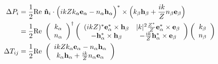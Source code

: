 \documentclass[letterpaper]{article}
\begin{document}
\begin{align}
 \Delta P_i
 &= \frac{1}{2}\text{Re }
    \mathbf{\hat n}_i
    \cdot 
    \Big(ikZ k_\alpha \mathbf{e}_\alpha - n_\alpha \mathbf{h}_\alpha\Big)^* 
    \times
    \Big( k_\beta \mathbf{h}_\beta + \frac{ik}{Z} n_\beta \mathbf{e}_\beta \Big)
\\
&= \frac{1}{2}\text{Re }
   \left(\begin{array}{c}
     k_\alpha \\ n_\alpha 
   \end{array}\right)^\dagger
   \left(\begin{array}{cc}
    (ikZ)^*              \mathbf{e}^*_\alpha \times \mathbf{h}_\beta & 
    |k|^2 \frac{Z^*}{Z}  \mathbf{e}^*_\alpha \times \mathbf{e}_\beta \\
  -                      \mathbf{h}^*_\alpha \times \mathbf{h}_\beta & 
  - \frac{ik}{Z}         \mathbf{h}^*_\alpha \times \mathbf{e}_\beta
   \end{array}\right)
   \left(\begin{array}{c}
     k_\beta\\ n_\beta
   \end{array}\right)
\\
 \Delta T_{ij}
 &= \frac{1}{2}\text{Re }
    \left(\begin{array}{c}
    ikZ k_\alpha \mathbf{e}_\alpha - n_\alpha \mathbf{h}_\alpha \\
        k_\alpha \mathbf{h}_\alpha + \frac{ik}{Z} n_\alpha \mathbf{e}_\alpha
    \end{array}\right)
\end{align}

\newpage


\end{document}
